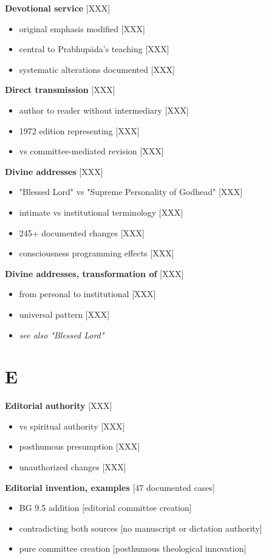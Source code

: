 \documentclass[11pt,twoside]{book}
\begin{document}
\textbf{\textbf{Devotional service}} {[}XXX]
\begin{itemize}
\item original emphasis modified [XXX]
\item central to Prabhupāda's teaching [XXX]
\item systematic alterations documented [XXX]
\end{itemize}

\textbf{\textbf{Direct transmission}} {[}XXX]
\begin{itemize}
\item author to reader without intermediary [XXX]
\item 1972 edition representing [XXX]
\item vs committee-mediated revision [XXX]
\end{itemize}

\textbf{\textbf{Divine addresses}} {[}XXX]
\begin{itemize}
\item "Blessed Lord" vs "Supreme Personality of Godhead" [XXX]
\item intimate vs institutional terminology [XXX]
\item 245+ documented changes [XXX]
\item consciousness programming effects [XXX]
\end{itemize}

\textbf{\textbf{Divine addresses, transformation of}} {[}XXX]
\begin{itemize}
\item from personal to institutional [XXX]
\item universal pattern [XXX]
\item \emph{see also "Blessed Lord"}
\end{itemize}
\section*{E}
\label{sec:org94db034}

\textbf{\textbf{Editorial authority}} {[}XXX]
\begin{itemize}
\item vs spiritual authority [XXX]
\item posthumous presumption [XXX]
\item unauthorized changes [XXX]
\end{itemize}

\textbf{\textbf{Editorial invention, examples}} {[}47 documented cases]
\begin{itemize}
\item BG 9.5 addition [editorial committee creation]
\item contradicting both sources [no manuscript or dictation authority]
\item pure committee creation [posthumous theological innovation]
\end{itemize}
\end{document}
